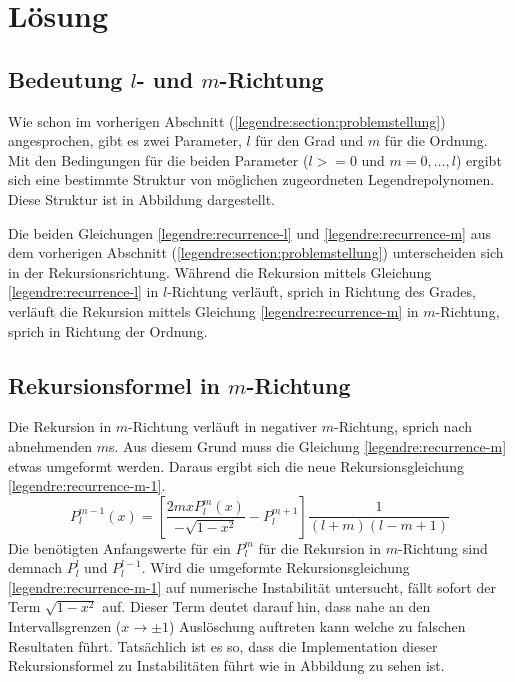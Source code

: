 %
%
%
\section{Lösung
\label{legendre:section:loesung}}
\subsection{Bedeutung $l$- und $m$-Richtung
\label{legendre:subsection:lmrichtung}}
Wie schon im vorherigen Abschnitt (\ref{legendre:section:problemstellung}) angesprochen, gibt es zwei Parameter, $l$ für den Grad und $m$ für die Ordnung.
Mit den Bedingungen für die beiden Parameter ($l>=0$ und $m=0, \ldots , l$) ergibt sich eine bestimmte Struktur von möglichen zugeordneten Legendrepolynomen.
Diese Struktur ist in Abbildung  dargestellt.


Die beiden Gleichungen \eqref{legendre:recurrence-l} und \eqref{legendre:recurrence-m} aus dem vorherigen Abschnitt (\ref{legendre:section:problemstellung}) unterscheiden sich in der Rekursionsrichtung.
Während die Rekursion mittels Gleichung \eqref{legendre:recurrence-l} in $l$-Richtung verläuft, sprich in Richtung des Grades, verläuft die Rekursion mittels Gleichung \eqref{legendre:recurrence-m} in $m$-Richtung, sprich in Richtung der Ordnung.

\subsection{Rekursionsformel in $m$-Richtung
\label{legendre:subsection:mrichtung}}
Die Rekursion in $m$-Richtung verläuft in negativer $m$-Richtung, sprich nach abnehmenden $m$s.
Aus diesem Grund muss die Gleichung \eqref{legendre:recurrence-m} etwas umgeformt werden.
Daraus ergibt sich die neue Rekursionsgleichung \eqref{legendre:recurrence-m-1}.
\begin{equation}
P^{m-1}_{l}(x)
= \left[ \frac{2mxP^{m}_{l}(x)}{- \sqrt{1-x^2}}-P^{m+1}_{l} \right]
\frac{1}{(l+m)(l-m+1)}
\label{legendre:recurrence-m-1}
\end{equation}
Die benötigten Anfangswerte für ein $P^{m}_{l}$ für die Rekursion in $m$-Richtung sind demnach $P^{l}_{l}$ und $P^{l-1}_{l}$.
Wird die umgeformte Rekursionsgleichung \eqref{legendre:recurrence-m-1} auf numerische Instabilität untersucht, fällt sofort der Term $\sqrt{1-x^2}$ auf.
Dieser Term deutet darauf hin, dass nahe an den Intervallsgrenzen ($x \rightarrow \pm 1$) Auslöschung auftreten kann welche zu falschen Resultaten führt.
Tatsächlich ist es so, dass die Implementation dieser Rekursionsformel zu Instabilitäten führt wie in Abbildung  zu sehen ist.

